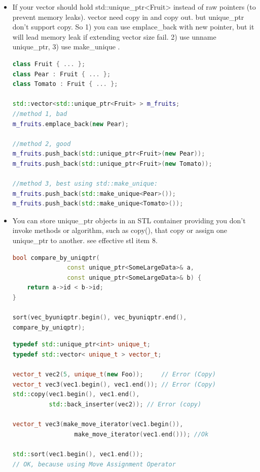 \documentclass[a4paper,12pt,twoside]{book}
\begin{document}
\begin{itemize}

\item If your vector should hold std::unique\_ptr<Fruit> instead of raw pointers (to prevent memory leaks). vector need copy in and copy out. but unique\_ptr don't support copy. So 1) you can use emplace\_back with new pointer, but it will lead memory leak if extending vector size fail. 2) use unname unique\_ptr, 3) use make\_unique .
\begin{lstlisting}[frame=single, language=c++]
class Fruit { ... };
class Pear : Fruit { ... };
class Tomato : Fruit { ... };

std::vector<std::unique_ptr<Fruit> > m_fruits;
//method 1, bad
m_fruits.emplace_back(new Pear);

//method 2, good
m_fruits.push_back(std::unique_ptr<Fruit>(new Pear));
m_fruits.push_back(std::unique_ptr<Fruit>(new Tomato));

//method 3, best using std::make_unique:
m_fruits.push_back(std::make_unique<Pear>());
m_fruits.push_back(std::make_unique<Tomato>());
\end{lstlisting}

\item You can store unique\_ptr objects in an STL container providing you don't invoke methods or algorithm, such as copy(), that copy or assign one unique\_ptr to another.  see effective stl item 8.

\begin{lstlisting}[frame=single, language=c++]
bool compare_by_uniqptr(
               const unique_ptr<SomeLargeData>& a,
               const unique_ptr<SomeLargeData>& b) {
    return a->id < b->id;
}

sort(vec_byuniqptr.begin(), vec_byuniqptr.end(),
compare_by_uniqptr);
\end{lstlisting}


\begin{lstlisting}[frame=single, language=c++]
typedef std::unique_ptr<int> unique_t;
typedef std::vector< unique_t > vector_t;

vector_t vec2(5, unique_t(new Foo));     // Error (Copy)
vector_t vec3(vec1.begin(), vec1.end()); // Error (Copy)
std::copy(vec1.begin(), vec1.end(),
          std::back_inserter(vec2)); // Error (copy)

vector_t vec3(make_move_iterator(vec1.begin()),
                 make_move_iterator(vec1.end())); //Ok

std::sort(vec1.begin(), vec1.end());
// OK, because using Move Assignment Operator
\end{lstlisting}


\end{itemize}
\end{document}
